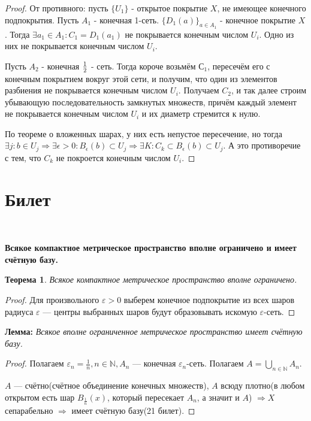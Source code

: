 \documentclass[a4paper,100pt]{article}
\theoremstyle{indented}
\newtheorem{theorem}{Теорема}
\begin{document}
\begin{proof}
    От противного: пусть $\{U_1\}$ - открытое покрытие $X$, не имеющее конечного подпокрытия. Пусть $A_1$ - конечная 1-сеть. $\{D_1(a)\}_{a\in A_1}$ - конечное покрытие $X$. Тогда $\exists a_1 \in A_1: C_1 = D_1(a_1)$ не покрывается конечным числом $U_i$. Одно из них не покрывается конечным числом $U_i$. \

    Пусть $A_2$ - конечная $1\over 2$ - сеть. Тогда короче возьмём $С_1$, пересечём его с конечным покрытием вокруг этой сети, и получим, что один из элементов разбиения не покрывается конечным числом $U_i$. Получаем $C_2$, и так далее строим убывающую последовательность замкнутых множеств, причём каждый элемент не покрывается конечным числом $U_i$ и их диаметр стремится к нулю.\
    
    По теореме о вложенных шарах, у них есть непустое пересечение, но тогда $\exists j: b\in U_j \Rightarrow  \exists \epsilon >0 : B_\epsilon(b)\subset U_j \Rightarrow \exists K: C_k \subset B_\epsilon (b)\subset U_j$. А это противоречие с тем, что $C_k$ не покроется конечным числом $U_i$.
\end{proof}


\section{Билет} \

\medskip

\textbf{Всякое компактное метрическое пространство вполне ограничено и имеет счётную базу.}\\
     
     \begin{theorem}
         Всякое компактное метрическое пространство вполне ограничено.
     \end{theorem}
     
     \begin{proof}
         Для произвольного $\varepsilon > 0$ выберем конечное подпокрытие из всех шаров радиуса $\varepsilon$ --- центры выбранных шаров будут образовывать искомую $\varepsilon$-сеть.
     \end{proof}
     
     \textbf{Лемма:}
     \textit{Всякое вполне ограниченное метрическое пространство имеет счётную базу.}
     
     \begin{proof}
         Полагаем $\varepsilon_n = \frac1n, n \in \mathbb N, A_n$ --- конечная $\varepsilon_n$-сеть. Полагаем $A = \bigcup_{n\in \mathbb N} A_n.$
         
         $A$ --- счётно(счётное объединение конечных множеств), $A$ всюду плотно(в любом открытом есть шар $B_{\frac1n}(x)$, который пересекает $A_n$, а значит и $A$) $\Rightarrow X$ сепарабельно $\Rightarrow$ имеет счётную базу(21 билет).
     \end{proof}
     
\end{document}
